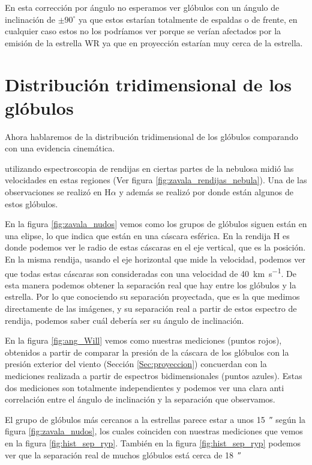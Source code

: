 \documentclass{book}
\begin{document}
En esta corrección por ángulo no esperamos ver glóbulos con un ángulo de inclinación de $\pm 90^\circ$ ya que estos estarían totalmente de espaldas o de frente, en cualquier caso estos no los podríamos ver porque se verían afectados por la emisión de la estrella WR ya que en proyección estarían muy cerca de la estrella.

\section{Distribución tridimensional de los glóbulos} \label{sec: distrtibucion}

Ahora hablaremos de la distribución tridimensional de los glóbulos comparando con una evidencia cinemática.

\cite{Zavala:2022} utilizando espectroscopia de rendijas en ciertas partes de la nebulosa midió las velocidades en estas regiones (Ver figura \ref{fig:zavala_rendijas_nebula}). Una de las observaciones se realizó en H$\alpha$ y además se realizó por donde están algunos de estos glóbulos. 

En la figura \ref{fig:zavala_nudos} vemos como los grupos de glóbulos siguen están en una elipse, lo que indica que están en una cáscara esférica. En la rendija H es donde podemos ver le radio de estas cáscaras en el eje vertical, que es la posición. En la misma rendija, usando el eje horizontal que mide la velocidad, podemos ver que todas estas cáscaras son consideradas con una velocidad de \SI{40}{km.s^{-1}}. De esta manera podemos obtener la separación real que hay entre los glóbulos y la estrella. Por lo que conociendo su separación proyectada, que es la que medimos directamente de las imágenes, y su separación real a partir de estos espectro de rendija, podemos saber cuál debería ser su ángulo de inclinación.

En la figura \ref{fig:ang_Will} vemos como nuestras mediciones (puntos rojos), obtenidos a partir de comparar la presión de la cáscara de los glóbulos con la presión exterior del viento (Sección \ref{Sec:proyeccion}) concuerdan con la mediciones realizada a partir de espectros bidimensionales (puntos azules). Estas dos mediciones son totalmente independientes y podemos ver una clara anti correlación entre el ángulo de inclinación y la separación que observamos.

El grupo de glóbulos más cercanos a la estrellas parece estar a unos \SI{15}{\arcsecond} según la figura \ref{fig:zavala_nudos}, los cuales coinciden con nuestras mediciones que vemos en la figura \ref{fig:hist_sep_ryp}. También en la figura \ref{fig:hist_sep_ryp} podemos ver que la separación real de muchos glóbulos está cerca de \SI{18}{\arcsecond}
\end{document}
